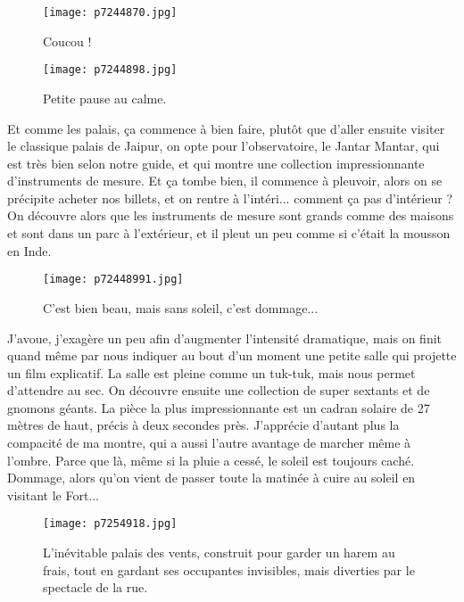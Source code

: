 \documentclass{book}
\begin{document}
\begin{figure}[h]
\centering
\texttt{[image: p7244870.jpg]}
\caption*{Coucou !}
\end{figure}


\begin{figure}[h]
\centering
\texttt{[image: p7244898.jpg]}
\caption*{Petite pause au calme.}
\end{figure}

Et comme les palais, ça commence à bien faire, plutôt que d'aller ensuite visiter le classique palais de Jaipur, on opte pour l'observatoire, le Jantar Mantar, qui est très bien selon notre guide, et qui montre une collection impressionnante d'instruments de mesure. Et ça tombe bien, il commence à pleuvoir, alors on se précipite acheter nos billets, et on rentre à l'intéri... comment ça pas d'intérieur ? On découvre alors que les instruments de mesure sont grands comme des maisons et sont dans un parc à l'extérieur, et il pleut un peu comme si c'était la mousson en Inde.


\begin{figure}[h]
\centering
\texttt{[image: p72448991.jpg]}
\caption*{C'est bien beau, mais sans soleil, c'est dommage...}
\end{figure}

J'avoue, j'exagère un peu afin d'augmenter l'intensité dramatique, mais on finit quand même par nous indiquer au bout d'un moment une petite salle qui projette un film explicatif. La salle est pleine comme un tuk-tuk, mais nous permet d'attendre au sec. On découvre ensuite une collection de super sextants et de gnomons géants. La pièce la plus impressionnante est un cadran solaire de 27 mètres de haut, précis à deux secondes près. J'apprécie d'autant plus la compacité de ma montre, qui a aussi l'autre avantage de marcher même à l'ombre. Parce que là, même si la pluie a cessé, le soleil est toujours caché. Dommage, alors qu'on vient de passer toute la matinée à cuire au soleil en visitant le Fort...


\begin{figure}[h]
\centering
\texttt{[image: p7254918.jpg]}
\caption*{L'inévitable palais des vents, construit pour garder un harem au frais, tout en gardant ses occupantes invisibles, mais diverties par le spectacle de la rue.}
\end{figure}
\end{document}
